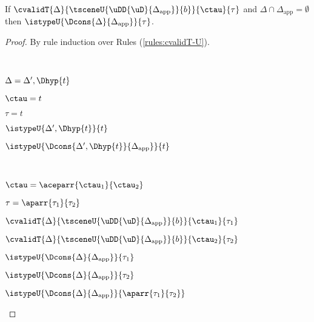 \begin{lemma}\label{lemma:candidate-expansion-type-validation}
If $\cvalidT{\Delta}{\tsceneU{\uDD{\uD}{\Delta_\text{app}}}{b}}{\ctau}{\tau}$ and $\Delta \cap \Delta_\text{app}=\emptyset$ then $\istypeU{\Dcons{\Delta}{\Delta_\text{app}}}{\tau}$.
\end{lemma}
\begin{proof} By rule induction over Rules (\ref{rules:cvalidT-U}).
\begin{byCases}
\item[\text{(\ref{rule:cvalidT-U-tvar})}] ~
\begin{pfsteps*}
   \item $\Delta=\Delta', \Dhyp{t}$ 
   \item $\ctau=t$ 
   \item $\tau=t$ 
   \item $\istypeU{\Delta', \Dhyp{t}}{t}$  
   \item $\istypeU{\Dcons{\Delta', \Dhyp{t}}{\Delta_\text{app}}}{t}$ 
 \end{pfsteps*} 
\resetpfcounter

\item[\text{(\ref{rule:cvalidT-U-parr})}] ~
\begin{pfsteps*}
  \item $\ctau=\aceparr{\ctau_1}{\ctau_2}$ 
  \item $\tau=\aparr{\tau_1}{\tau_2}$ 
  \item $\cvalidT{\Delta}{\tsceneU{\uDD{\uD}{\Delta_\text{app}}}{b}}{\ctau_1}{\tau_1}$  
  \item $\cvalidT{\Delta}{\tsceneU{\uDD{\uD}{\Delta_\text{app}}}{b}}{\ctau_2}{\tau_2}$  
  \item $\istypeU{\Dcons{\Delta}{\Delta_\text{app}}}{\tau_1}$  
  \item $\istypeU{\Dcons{\Delta}{\Delta_\text{app}}}{\tau_2}$  
  \item $\istypeU{\Dcons{\Delta}{\Delta_\text{app}}}{\aparr{\tau_1}{\tau_2}}$ 
\end{pfsteps*}
\resetpfcounter


\end{byCases}
\end{proof}
